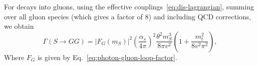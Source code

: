 \documentclass[a4paper,12pt,dvipsnames,usernames]{article}
\begin{document}
For decays into gluons, using the effective couplings~\eqref{eq:dis-lagrangian}, summing over all gluon species (which gives a factor of 8) and including QCD corrections, we obtain~\cite{Spira:1997dg}
\begin{equation}
    \Gamma (S \rightarrow GG) = 
    |F_{G}(m_{S})|^2 \left( \frac{\alpha_s}{4 \pi} \right)^2 \frac{\theta^2 m_S^3}{8 \pi v^2} \left( 1 + \frac{m_t^2}{8 v^2 \pi^2} \right),
    \label{eq:decay-gluons}
\end{equation}
Where $F_{G}$ is given by Eq.~\eqref{eq:photon-gluon-loop-factor}.



\end{document}
